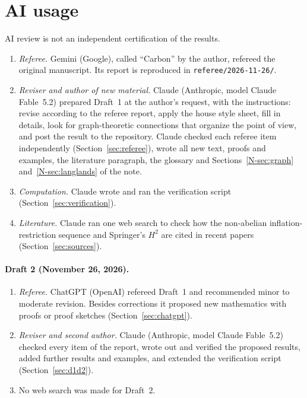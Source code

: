 \documentclass[12pt,letterpaper]{article}
\begin{document}
\section{AI usage}\label{sec:ai}

AI review is not an independent certification of the results.

\begin{enumerate}[itemsep=1pt]
\item \emph{Referee.} Gemini (Google), called ``Carbon'' by the author,
  refereed the original manuscript. Its report is reproduced in
  \texttt{referee/2026-11-26/}.
\item \emph{Reviser and author of new material.} Claude (Anthropic, model
  Claude Fable~5.2) prepared Draft~1 at the author's request, with the
  instructions: revise according to the referee report, apply the house
  style sheet, fill in details, look for graph-theoretic connections that
  organize the point of view, and post the result to the repository.
  Claude checked each referee item independently
  (Section~\ref{sec:referee}), wrote all new text, proofs and examples, the
  literature paragraph, the glossary and Sections~\ref{N-sec:graph}
  and~\ref{N-sec:langlands} of the note.
\item \emph{Computation.} Claude wrote and ran the verification script
  (Section~\ref{sec:verification}).
\item \emph{Literature.} Claude ran one web search to check how the
  non-abelian inflation-restriction sequence and Springer's $H^2$ are cited
  in recent papers (Section~\ref{sec:sources}).
\end{enumerate}

\paragraph{Draft 2 (November 26, 2026).}
\begin{enumerate}[itemsep=1pt]
\item \emph{Referee.} ChatGPT (OpenAI) refereed Draft~1 and recommended
  minor to moderate revision. Besides corrections it proposed new
  mathematics with proofs or proof sketches
  (Section~\ref{sec:chatgpt}).
\item \emph{Reviser and second author.} Claude (Anthropic, model Claude
  Fable~5.2) checked every item of the report, wrote out and verified the
  proposed results, added further results and examples, and extended the
  verification script (Section~\ref{sec:d1d2}).
\item No web search was made for Draft~2.
\end{enumerate}
\end{document}
